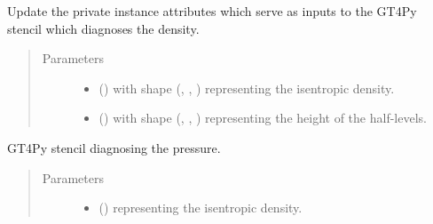 \documentclass[letterpaper,10pt,english]{sphinxmanual}
\begin{document}
\begin{fulllineitems}
\begin{fulllineitems}
\end{fulllineitems}


\begin{fulllineitems}
\label{\detokenize{api:tasmania.dycore.diagnostic_isentropic.DiagnosticIsentropic._stencil_diagnosing_air_density_set_inputs}}
Update the private instance attributes which serve as inputs to the GT4Py stencil which diagnoses the density.
\begin{quote}\begin{description}
\item[{Parameters}] \leavevmode\begin{itemize}
\item {} 
 () \textendash{}  with shape (, , ) representing the isentropic density.

\item {} 
 () \textendash{}  with shape (, , ) representing the height of the half-levels.

\end{itemize}

\end{description}\end{quote}

\end{fulllineitems}


\begin{fulllineitems}
\label{\detokenize{api:tasmania.dycore.diagnostic_isentropic.DiagnosticIsentropic._stencil_diagnosing_air_pressure_defs}}
GT4Py stencil diagnosing the pressure.
\begin{quote}\begin{description}
\item[{Parameters}] \leavevmode\begin{itemize}
\item {} 
 () \textendash{}  representing the isentropic density.


\end{itemize}
\end{description}
\end{quote}
\end{fulllineitems}
\end{fulllineitems}
\end{document}
